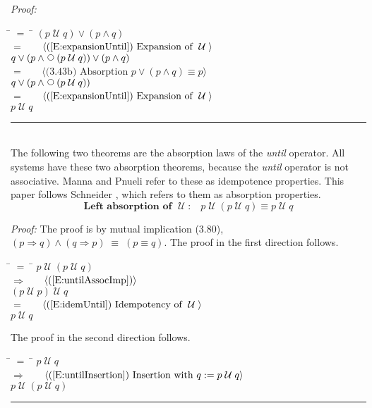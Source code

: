 \documentclass[fleqn, leqno]{article}
\newcommand{\lgap}{2pt}                             %
\newcommand{\mymathindent}{24pt}                    %
\newcommand{\equivs}{\ensuremath{\;\equiv\;}}       %
\newcommand{\impl}{\ensuremath{\Rightarrow}}        %
\newcommand{\Until}{\;\mathcal{U}\;}
\newcommand{\Next}{\;\,\text{\raisebox{3.5pt}{\circle{6}}}}
\newcommand{\myqed}{\hfill\rule[-.23ex]{1.2ex}{2.0ex}}
\newcommand{\Gll} {\langle}                         %
\newcommand{\Ggg} {\rangle}                         %
\newcommand{\Hint}[1]     {\ \ \ $\Gll              \mbox{#1} \Ggg$ }   %
\begin{document}
\emph{Proof:}
\begin{tabbing}
\hspace{\mymathindent} \= $= \;$ \= \kill
  \> \>   $(p \Until q) \lor (p \land q)$\\[\lgap]
  \> $=$  \>  \Hint{(\ref{E:expansionUntil}) Expansion of $\Until$}\\[\lgap]
  \> \>   $q \lor (p \land \Next(p \Until q)) \lor (p \land q)$\\[\lgap]
  \> $=$  \>  \Hint{(3.43b) Absorption $p \lor (p \land q) \equiv p$}\\[\lgap]
  \> \>   $q \lor (p \land \Next(p \Until q))$\\[\lgap]
  \> $=$  \>  \Hint{(\ref{E:expansionUntil}) Expansion of $\Until$}\\[\lgap]
  \> \>   $p \Until q$
\end{tabbing}
\myqed\\[\lgap]

The following two theorems are the absorption laws of the \textit{until} operator.
All systems have these two absorption theorems, because the \textit{until} operator is not associative.
Manna and Pnueli \cite{Manna} refer to these as idempotence properties.
This paper follows Schneider \cite{Schn}, which refers to them as absorption properties.
\begin{equation}\label{E:untilIdem}
\textbf{Left absorption of $\Until$:}\quad p \Until (p \Until q) \equiv p \Until q
\end{equation}

\emph{Proof:} The proof is by mutual implication (3.80), $(p\impl q) \land (q\impl p) \equivs (p\equiv q)$.
The proof in the first direction follows.
\begin{tabbing}
\hspace{\mymathindent} \= $= \;$ \= \kill
  \> \>   $p \Until (p \Until q)$\\[\lgap]
  \> $\impl$  \>  \Hint{(\ref{E:untilAssocImp})}\\[\lgap]
  \> \>   $(p \Until p) \Until q$\\[\lgap]
  \> $=$  \>  \Hint{(\ref{E:idemUntil}) Idempotency of $\Until$}\\[\lgap]
  \> \>   $p \Until q$
\end{tabbing}

The proof in the second direction follows.

\begin{tabbing}
\hspace{\mymathindent} \= $= \;$ \= \kill
  \> \>   $p \Until q$\\[\lgap]
  \> $\impl$  \>  \Hint{(\ref{E:untilInsertion}) Insertion with $q := p \Until q$}\\[\lgap]
  \> \>   $p \Until (p \Until q)$\\[\lgap]
\end{tabbing}
\myqed\\[\lgap]
\end{document}
